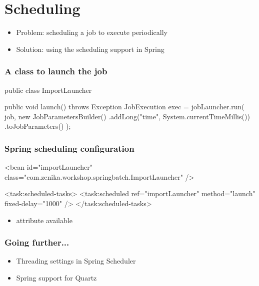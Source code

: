 \section{Scheduling}

\begin{frame}
 \begin{itemize}
  \item Problem: scheduling a job to execute periodically
  \item Solution: using the scheduling support in Spring
 \end{itemize}
\end{frame}

\begin{frame}[fragile]
 \frametitle{A class to launch the job}
 \begin{javacode}
public class ImportLauncher {

  public void launch() throws Exception {
    JobExecution exec = jobLauncher.run(
      job,
      new JobParametersBuilder() 
        .addLong("time", System.currentTimeMillis())
        .toJobParameters()
    );
  }
}
 \end{javacode}
\end{frame}

\begin{frame}[fragile]
 \frametitle{Spring scheduling configuration}
 \begin{xmlcode}
<bean id="importLauncher"
      class="com.zenika.workshop.springbatch.ImportLauncher" />

<task:scheduled-tasks>
  <task:scheduled ref="importLauncher" method="launch" 
                  fixed-delay="1000" />
</task:scheduled-tasks>
 \end{xmlcode}
 \begin{itemize}
  \item {} attribute available
 \end{itemize}

\end{frame}

\begin{frame}
 \frametitle{Going further...}
 \begin{itemize}
  \item Threading settings in Spring Scheduler
  \item Spring support for Quartz
 \end{itemize}
\end{frame}

